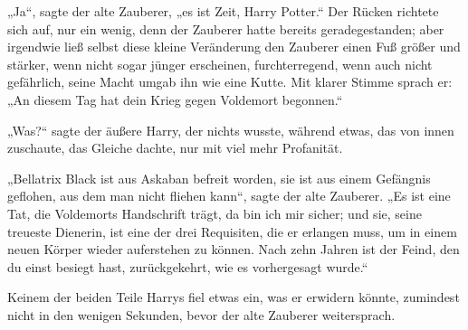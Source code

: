 „Ja“, sagte der alte Zauberer, „es ist Zeit, Harry Potter.“ Der Rücken richtete sich auf, nur ein wenig, denn der Zauberer hatte bereits geradegestanden; aber irgendwie ließ selbst diese kleine Veränderung den Zauberer einen Fuß größer und stärker, wenn nicht sogar jünger erscheinen, furchterregend, wenn auch nicht gefährlich, seine Macht umgab ihn wie eine Kutte. Mit klarer Stimme sprach er:
„An diesem Tag hat dein Krieg gegen Voldemort begonnen.“

„Was?“ sagte der äußere Harry, der nichts wusste, während etwas, das von innen zuschaute, das Gleiche dachte, nur mit viel mehr Profanität.

„Bellatrix Black ist aus Askaban befreit worden, sie ist aus einem Gefängnis geflohen, aus dem man nicht fliehen kann“, sagte der alte Zauberer.
„Es ist eine Tat, die Voldemorts Handschrift trägt, da bin ich mir sicher; und sie, seine treueste Dienerin, ist eine der drei Requisiten, die er erlangen muss, um in einem neuen Körper wieder auferstehen zu können. Nach zehn Jahren ist der Feind, den du einst besiegt hast, zurückgekehrt, wie es vorhergesagt wurde.“

Keinem der beiden Teile Harrys fiel etwas ein, was er erwidern könnte, zumindest nicht in den wenigen Sekunden, bevor der alte Zauberer weitersprach.

